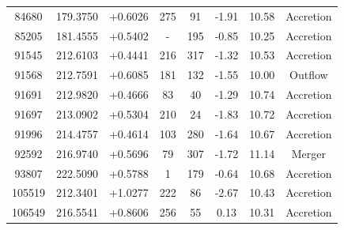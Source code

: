 \documentclass[fleqn,usenatbib]{mnras}
\begin{document}
\begin{table}
\begin{tabular*}{\linewidth}{cccccccc}
84680                     & 179.3750             & +0.6026                & 275                           & 91                          & -1.91%
& 10.58%
& Accretion                    \\
85205                     & 181.4555             & +0.5402                & -                           & 195                         & -0.85%
& 10.25%
&  Accretion                   \\
91545                     & 212.6103              & +0.4441                & 216                           & 317                         & -1.32%
& 10.53%
&  Accretion                  \\
91568                     & 212.7591              & +0.6085                & 181                           & 132                         & -1.55%
& 10.00%
& Outflow                   \\
91691                     & 212.9820             & +0.4666                & 83                            & 40                          & -1.29%
& 10.74%
&  Accretion                  \\
91697                     & 213.0902              & +0.5304                & 210                           & 24                          & -1.83%
& 10.72%
& Accretion                   \\
91996                     & 214.4757              & +0.4614                & 103                           & 280                         & -1.64%
& 10.67%
& Accretion                    \\
92592                     & 216.9740              & +0.5696                & 79                            & 307                         & -1.72%
& 11.14%
& Merger                    \\
93807                     & 222.5090              & +0.5788                 & 1                             & 179                         & -0.64%
& 10.68%
& Accretion     \\             
105519                     & 212.3401             & +1.0277                & 222                             & 86                         & -2.67%
& 10.43%
& Accretion     \\ 

106549                     & 216.5541             & +0.8606                & 256                             & 55                         & 0.13%
& 10.31%
& Accretion     \\ 


\end{tabular*}
\end{table}
\end{document}
